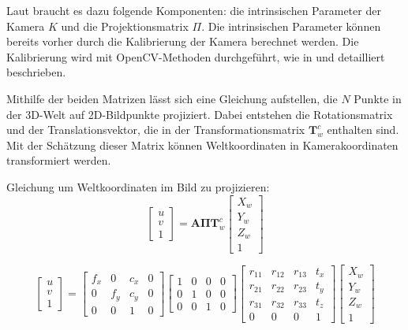 Laut \cite{pose} braucht es dazu folgende Komponenten: die intrinsischen Parameter 
der Kamera \( K \) und die Projektionsmatrix \( \Pi \). Die intrinsischen Parameter 
können bereits vorher durch die Kalibrierung der Kamera berechnet werden. Die Kalibrierung 
wird mit OpenCV-Methoden durchgeführt, wie in \cite{zhang} und \cite{bradski} detailliert 
beschrieben.

Mithilfe der beiden Matrizen lässt sich eine Gleichung aufstellen, die \( N \) Punkte 
in der 3D-Welt auf 2D-Bildpunkte projiziert. Dabei entstehen die Rotationsmatrix und der 
Translationsvektor, die in der Transformationsmatrix \(\mathbf{T}^c_{w}\) enthalten sind.
Mit der Schätzung dieser Matrix können Weltkoordinaten in Kamerakoordinaten transformiert 
werden.

Gleichung um Weltkoordinaten im Bild zu projizieren:
\[
\begin{bmatrix}
u \\ 
v \\ 
1
\end{bmatrix}
=
\mathbf{A} \mathbf{\Pi} \mathbf{T}^c_{w}
\begin{bmatrix}
X_w \\ 
Y_w \\ 
Z_w \\ 
1
\end{bmatrix}
\]

\[
\begin{bmatrix}
u \\ 
v \\ 
1
\end{bmatrix}
=
\begin{bmatrix}
f_x & 0   & c_x & 0 \\ 
0   & f_y & c_y & 0 \\ 
0   & 0   & 1   & 0
\end{bmatrix}
\begin{bmatrix}
1 & 0 & 0 & 0 \\ 
0 & 1 & 0 & 0 \\ 
0 & 0 & 1 & 0
\end{bmatrix}
\begin{bmatrix}
r_{11} & r_{12} & r_{13} & t_x \\ 
r_{21} & r_{22} & r_{23} & t_y \\ 
r_{31} & r_{32} & r_{33} & t_z \\ 
0      & 0      & 0      & 1
\end{bmatrix}
\begin{bmatrix}
X_w \\ 
Y_w \\ 
Z_w \\ 
1
\end{bmatrix}
\]

